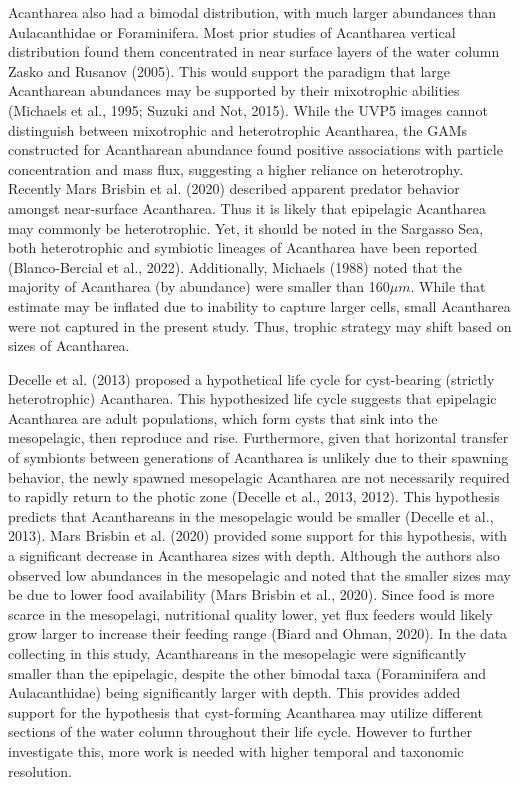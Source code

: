 \documentclass[
]{article}
\begin{document}
Acantharea also had a bimodal distribution, with much larger abundances
than Aulacanthidae or Foraminifera. Most prior studies of Acantharea
vertical distribution found them concentrated in near surface layers of
the water column Zasko and Rusanov (2005). This would support the
paradigm that large Acantharean abundances may be supported by their
mixotrophic abilities (Michaels et al., 1995; Suzuki and Not, 2015).
While the UVP5 images cannot distinguish between mixotrophic and
heterotrophic Acantharea, the GAMs constructed for Acantharean abundance
found positive associations with particle concentration and mass flux,
suggesting a higher reliance on heterotrophy. Recently Mars Brisbin et
al. (2020) described apparent predator behavior amongst near-surface
Acantharea. Thus it is likely that epipelagic Acantharea may commonly be
heterotrophic. Yet, it should be noted in the Sargasso Sea, both
heterotrophic and symbiotic lineages of Acantharea have been reported
(Blanco-Bercial et al., 2022). Additionally, Michaels (1988) noted that
the majority of Acantharea (by abundance) were smaller than
160\(\mu m\). While that estimate may be inflated due to inability to
capture larger cells, small Acantharea were not captured in the present
study. Thus, trophic strategy may shift based on sizes of Acantharea.

Decelle et al. (2013) proposed a hypothetical life cycle for
cyst-bearing (strictly heterotrophic) Acantharea. This hypothesized life
cycle suggests that epipelagic Acantharea are adult populations, which
form cysts that sink into the mesopelagic, then reproduce and rise.
Furthermore, given that horizontal transfer of symbionts between
generations of Acantharea is unlikely due to their spawning behavior,
the newly spawned mesopelagic Acantharea are not necessarily required to
rapidly return to the photic zone (Decelle et al., 2013, 2012). This
hypothesis predicts that Acanthareans in the mesopelagic would be
smaller (Decelle et al., 2013). Mars Brisbin et al. (2020) provided some
support for this hypothesis, with a significant decrease in Acantharea
sizes with depth. Although the authors also observed low abundances in
the mesopelagic and noted that the smaller sizes may be due to lower
food availability (Mars Brisbin et al., 2020). Since food is more scarce
in the mesopelagi, nutritional quality lower, yet flux feeders would
likely grow larger to increase their feeding range (Biard and Ohman,
2020). In the data collecting in this study, Acanthareans in the
mesopelagic were significantly smaller than the epipelagic, despite the
other bimodal taxa (Foraminifera and Aulacanthidae) being significantly
larger with depth. This provides added support for the hypothesis that
cyst-forming Acantharea may utilize different sections of the water
column throughout their life cycle. However to further investigate this,
more work is needed with higher temporal and taxonomic resolution.
\end{document}
